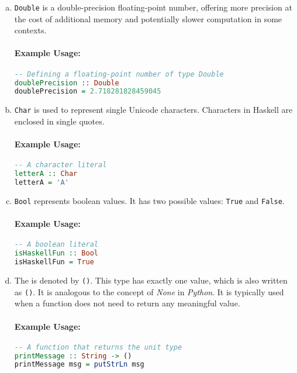 \begin{enumerate}[(a)]
\item \texttt{Double} is a double-precision floating-point number, offering more precision at the cost of
      additional memory and potentially slower computation in some contexts. 

\paragraph{Example Usage:}
\begin{lstlisting}[style=haskellstyle, language=Haskell]
-- Defining a floating-point number of type Double
doublePrecision :: Double
doublePrecision = 2.718281828459045
\end{lstlisting}

\item \texttt{Char} is used to represent single Unicode characters. Characters in Haskell are enclosed in single quotes.

\paragraph{Example Usage:}
\begin{lstlisting}[style=haskellstyle, language=Haskell]
-- A character literal
letterA :: Char
letterA = 'A'
\end{lstlisting}

\item \texttt{Bool} represents boolean values. It has two possible values: \texttt{True} and \texttt{False}.

\paragraph{Example Usage:}
\begin{lstlisting}[style=haskellstyle, language=Haskell]
-- A boolean literal
isHaskellFun :: Bool
isHaskellFun = True
\end{lstlisting}

\item The  is denoted by \texttt{()}.  This type has exactly one value, which is also written
  as \texttt{()}.  It is analogous to the concept of \textit{None} in \textsl{Python}. It is typically used
  when a function does not need to return any  meaningful value. 

\paragraph{Example Usage:}
\begin{lstlisting}[style=haskellstyle, language=Haskell]
-- A function that returns the unit type
printMessage :: String -> ()
printMessage msg = putStrLn msg
\end{lstlisting}
\end{enumerate}

